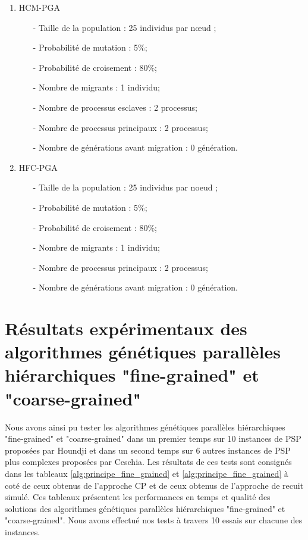 \documentclass[12pt,a4paper]{article}
\begin{document}
		\begin{enumerate}
			\item HCM-PGA \\
				\begin{itemize}
					\item[-] Taille de la population : 25 individus par nœud ;
			        \item[-] Probabilité de mutation : 5\%;
			        \item[-] Probabilité de croisement : 80\%;
			        \item[-] Nombre de migrants : 1 individu;
		 	        \item[-] Nombre de processus esclaves : 2 processus;
			        \item[-] Nombre de processus principaux : 2 processus;
			        \item[-] Nombre de générations avant migration : 0 génération.
				\end{itemize}
				\vspace*{.5cm}
			\item HFC-PGA \\
				\begin{itemize}
					\item[-] Taille de la population : 25 individus par noeud ;
			        \item[-] Probabilité de mutation : 5\%;
			        \item[-] Probabilité de croisement : 80\%;
			        \item[-] Nombre de migrants : 1 individu;
			        \item[-] Nombre de processus principaux : 2 processus;
			        \item[-] Nombre de générations avant migration : 0 génération.
				\end{itemize}
		\end{enumerate}
		
		\section{Résultats expérimentaux des algorithmes génétiques parallèles hiérarchiques "fine-grained" et "coarse-grained"}
		Nous avons ainsi pu tester les algorithmes génétiques parallèles hiérarchiques "fine-grained" et "coarse-grained" dans un premier temps sur 10 instances de PSP proposées par Houndji et dans un second temps sur 6 autres instances de PSP plus complexes proposées par Ceschia. Les résultats de ces tests sont consignés dans les tableaux \ref{alg:principe_fine_grained} et \ref{alg:principe_fine_grained} à coté de ceux obtenus de l'approche CP et de ceux obtenus de l'approche de recuit simulé. Ces tableaux présentent les performances en temps et qualité des solutions des algorithmes génétiques parallèles hiérarchiques "fine-grained" et "coarse-grained". Nous avons effectué nos tests à travers 10 essais sur chacune des instances.
		
\end{document}

